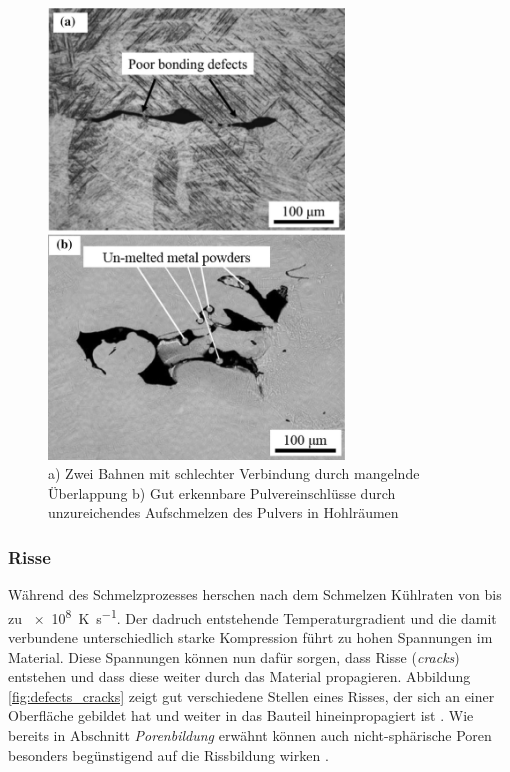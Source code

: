 		\begin{figure}[ht]
			\centering
			\includegraphics[width=0.7\textwidth]{chapter/main/img/defects/lack_of_fusion.png}
			\caption{a) Zwei Bahnen mit schlechter Verbindung durch mangelnde Überlappung
			b) Gut erkennbare Pulvereinschlüsse durch unzureichendes Aufschmelzen des Pulvers
			in Hohlräumen \cite{zhang2017defect}}
			\label{fig:defects_lof}
		\end{figure}

		\subsubsection{Risse}
		Während des Schmelzprozesses herschen nach dem Schmelzen Kühlraten von bis zu
		\SI{e8}{\kelvin\per\second}. Der dadruch entstehende Temperaturgradient und die damit
		verbundene unterschiedlich starke Kompression führt zu hohen Spannungen im Material.
		Diese Spannungen können nun dafür sorgen, dass Risse (\emph{cracks}) entstehen und dass
		diese weiter durch das Material propagieren. Abbildung \ref{fig:defects_cracks} zeigt gut
		verschiedene Stellen eines Risses, der sich an einer Oberfläche gebildet hat und weiter in
		das Bauteil hineinpropagiert ist \cite{zhang2017defect}. Wie bereits in Abschnitt
		\emph{Porenbildung} erwähnt können auch nicht-sphärische Poren besonders begünstigend auf
		die Rissbildung wirken \cite{galy2018main}.

